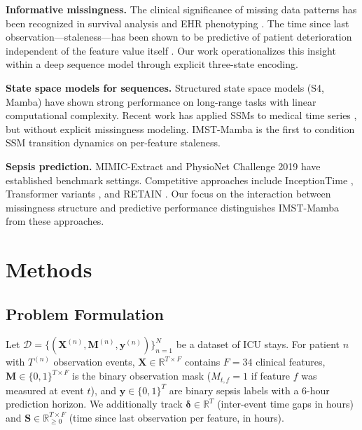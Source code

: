\documentclass[twoside,11pt]{article}
\begin{document}
\textbf{Informative missingness.}
The clinical significance of missing data patterns has been recognized in
survival analysis \citep{sperrin2020using} and EHR phenotyping
\citep{agniel2018biases}.  The time since last observation—staleness—has been
shown to be predictive of patient deterioration independent of the feature
value itself \citep{moor2019early}.  Our work operationalizes this insight
within a deep sequence model through explicit three-state encoding.

\textbf{State space models for sequences.}
Structured state space models (S4, Mamba) \citep{gu2022s4,gu2023mamba} have
shown strong performance on long-range tasks with linear computational
complexity.  Recent work has applied SSMs to medical time
series \citep{nguyen2024s4health}, but without explicit missingness modeling.
IMST-Mamba is the first to condition SSM transition dynamics on per-feature
staleness.

\textbf{Sepsis prediction.}
MIMIC-Extract \citep{wang2020mimicextract} and PhysioNet Challenge
2019 \citep{reyna2020early} have established benchmark settings.  Competitive
approaches include InceptionTime \citep{ismailfawaz2019deep}, Transformer
variants \citep{tipirneni2022selfsupervised}, and RETAIN \citep{choi2016retain}.
Our focus on the interaction between missingness structure and predictive
performance distinguishes IMST-Mamba from these approaches.

\section{Methods}
\label{sec:methods}

\subsection{Problem Formulation}
\label{sec:formulation}

Let $\mathcal{D} = \{(\mathbf{X}^{(n)}, \mathbf{M}^{(n)}, \mathbf{y}^{(n)})\}_{n=1}^{N}$
be a dataset of ICU stays.  For patient $n$ with $T^{(n)}$ observation events,
$\mathbf{X} \in \mathbb{R}^{T \times F}$ contains $F=34$ clinical features,
$\mathbf{M} \in \{0,1\}^{T \times F}$ is the binary observation mask
($M_{t,f}=1$ if feature $f$ was measured at event $t$), and
$\mathbf{y} \in \{0,1\}^T$ are binary sepsis labels with a 6-hour prediction
horizon.  We additionally track $\boldsymbol{\delta} \in \mathbb{R}^T$
(inter-event time gaps in hours) and
$\mathbf{S} \in \mathbb{R}_{\geq 0}^{T \times F}$ (time since last observation
per feature, in hours).
\end{document}
